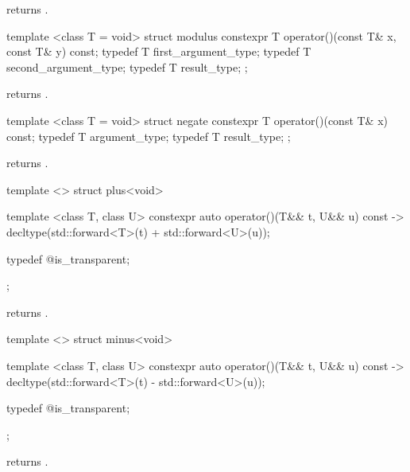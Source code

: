 \begin{itemdescr}
\pnum
{}
returns
.
\end{itemdescr}

%
\begin{itemdecl}
template <class T = void> struct modulus {
  constexpr T operator()(const T& x, const T& y) const;
  typedef T first_argument_type;
  typedef T second_argument_type;
  typedef T result_type;
};
\end{itemdecl}

\begin{itemdescr}
\pnum
{} returns .
\end{itemdescr}

%
\begin{itemdecl}
template <class T = void> struct negate {
  constexpr T operator()(const T& x) const;
  typedef T argument_type;
  typedef T result_type;
};
\end{itemdecl}

\begin{itemdescr}
\pnum
{} returns .
\end{itemdescr}

%
\begin{itemdecl}
template <> struct plus<void> {
  template <class T, class U> constexpr auto operator()(T&& t, U&& u) const
    -> decltype(std::forward<T>(t) + std::forward<U>(u));

  typedef @\unspec@ is_transparent;
};
\end{itemdecl}

\begin{itemdescr}
\pnum
{} returns .
\end{itemdescr}

%
\begin{itemdecl}
template <> struct minus<void> {
  template <class T, class U> constexpr auto operator()(T&& t, U&& u) const
    -> decltype(std::forward<T>(t) - std::forward<U>(u));

  typedef @\unspec@ is_transparent;
};
\end{itemdecl}

\begin{itemdescr}
\pnum
{} returns .
\end{itemdescr}

